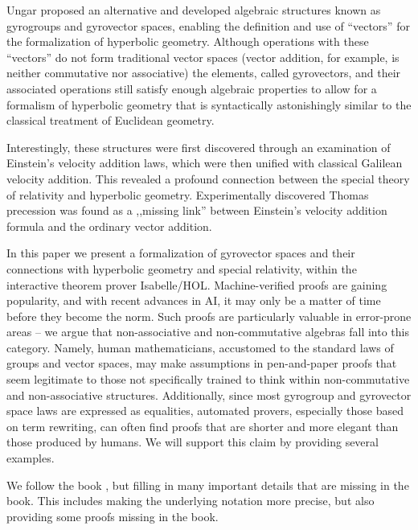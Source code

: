 \documentclass[a4paper]{article}
\theoremstyle{definition}
\begin{document}
Ungar \cite{ungar-analytic} proposed an alternative and developed
algebraic structures known as gyrogroups and gyrovector spaces,
enabling the definition and use of ``vectors'' for the formalization
of hyperbolic geometry. Although operations with these ``vectors'' do
not form traditional vector spaces (vector addition, for example, is
neither commutative nor associative) the elements, called gyrovectors,
and their associated operations still satisfy enough algebraic
properties to allow for a formalism of hyperbolic geometry that is
syntactically astonishingly similar to the classical treatment of
Euclidean geometry.

Interestingly, these structures were first discovered through an
examination of Einstein's velocity addition laws, which were then
unified with classical Galilean velocity addition. This revealed a
profound connection between the special theory of relativity and
hyperbolic geometry. Experimentally discovered Thomas
precession\cite{ungar-analytic} was found as a ,,missing link''
between Einstein's velocity addition formula and the ordinary vector
addition.

In this paper we present a formalization of gyrovector spaces and
their connections with hyperbolic geometry and special relativity,
within the interactive theorem prover Isabelle/HOL. Machine-verified
proofs are gaining popularity, and with recent advances in AI, it may
only be a matter of time before they become the norm. Such proofs are
particularly valuable in error-prone areas -- we argue that
non-associative and non-commutative algebras fall into this
category. Namely, human mathematicians, accustomed to the standard
laws of groups and vector spaces, may make assumptions in
pen-and-paper proofs that seem legitimate to those not specifically
trained to think within non-commutative and non-associative
structures. Additionally, since most gyrogroup and gyrovector space
laws are expressed as equalities, automated provers, especially those
based on term rewriting, can often find proofs that are shorter and
more elegant than those produced by humans. We will support this claim
by providing several examples.

We follow the book \cite{ungar-analytic}, but filling in many
important details that are missing in the book. This includes making
the underlying notation more precise, but also providing some proofs
missing in the book.
\end{document}
